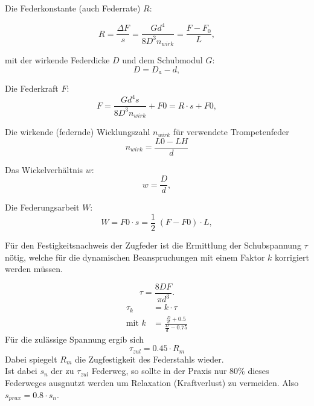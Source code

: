 Die Federkonstante (auch Federrate) $R$:

\begin{equation}
    R=\frac{\Delta F}{s}=\frac{Gd^4}{8D^3n_{wirk}}=\frac{F-F_0}{L},
    \label{eqn:federrate}
\end{equation}

mit der wirkende Federdicke $D$ und dem Schubmodul $G$:
\begin{equation}
    D=D_a-d,
\end{equation}

Die Federkraft $F$:
\begin{equation}
    F=\frac{Gd^4s}{8D^3n_{wirk}}+F0=R \cdot s +F0,
    \label{eqn:federkraft}
\end{equation}

Die wirkende (federnde) Wicklungszahl $n_{wirk}$ für verwendete Trompetenfeder
\begin{equation}
    n_{wirk}=\frac{L0-LH}{d}    
\end{equation}

Das Wickelverhältnis $w$:
\begin{equation}
    w=\frac{D}{d},
\end{equation}

Die Federungsarbeit $W$:
\begin{equation}
    W=F0 \cdot s = \frac{1}{2}\;(F-F0) \cdot L,
    \label{eqn:federungsarbeit}
\end{equation}
\newline




Für den Festigkeitsnachweis der Zugfeder ist die Ermittlung der Schubspannung $\tau$
nötig, welche für die dynamischen Beanspruchungen mit einem Faktor $k$ korrigiert werden müssen.

\begin{equation}
    \tau = \frac{8DF}{\pi d^3}.
    \label{eqn:schubspannung}
\end{equation}
\begin{align}
    \tau_k &= k \cdot \tau\\
    \text{mit }k&=\frac{\frac{D}{d}+0.5}{\frac{D}{d}-0.75}
\end{align}
Für die zulässige Spannung ergib sich
\begin{equation}
    \tau_{zul}=0.45 \cdot R_m
\end{equation}
Dabei spiegelt $R_m$ die Zugfestigkeit des Federstahls wieder.\\
Ist dabei $s_n$ der zu $\tau_{zul}$ Federweg, so sollte in der Praxis nur 80\% dieses
Federweges ausgnutzt werden um Relaxation (Kraftverlust) zu vermeiden.
Also $s_{prax}=0.8 \cdot s_n$.  


